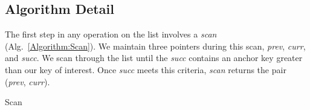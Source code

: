 \documentclass{llncs}
\begin{document}
\subsection{Algorithm Detail}

The first step in any operation on the list involves a {\em scan} (Alg.~{\ref{Algorithm:Scan}}).
We maintain three pointers during this scan, {\em prev}, {\em curr}, and {\em succ}.
We scan through the list until the {\em succ} contains an anchor key
greater than our key of interest.  Once {\em succ} meets this criteria,
{\em scan} returns the pair ({\em prev}, {\em curr}).

\begin{algorithm}
\DontPrintSemicolon
{}
\caption{Scan}
\label{Algorithm:Scan}
\end{algorithm}
\end{document}
